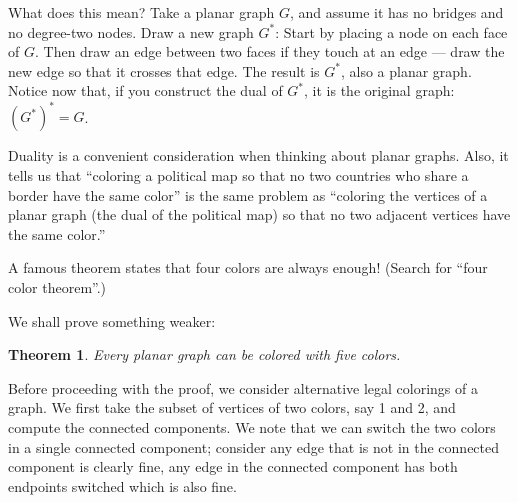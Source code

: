 \documentclass[11pt]{article}
\newcounter{thm}
\newtheorem{theorem}{Theorem}[thm]
\begin{document}
What does this mean?  Take a planar graph $G$, and assume it has no
bridges and no degree-two nodes.  Draw a new graph $G^*$:  Start by
placing a node on each face of $G$.  Then draw an edge between two
faces if they touch at an edge --- draw the new edge so that it
crosses that edge.  The result is $G^*$, also a planar graph.
Notice now that, if you construct the dual of $G^*$, it is the
original graph: $(G^*)^*=G$.

Duality is a convenient consideration when thinking about planar
graphs.  Also, it tells us that ``coloring a political map so that
no two countries who share a border have the same color'' is the
same problem as ``coloring the vertices of a planar graph (the dual
of the political map) so that no two adjacent vertices have the same
color.''  



A famous theorem states that four colors are always
enough!  (Search for ``four color theorem''.)  


We shall prove something weaker:

\begin{theorem}
Every planar graph can be colored with five colors.
\end{theorem}

Before proceeding with the proof, we consider alternative legal
colorings of a graph. We first take the subset of vertices of two
colors, say 1 and 2, and compute the connected components.  We note
that we can switch the two colors in a single connected component;
consider any edge that is not in the connected component is clearly
fine, any edge in the connected component has both endpoints switched
which is also fine.
\end{document}
